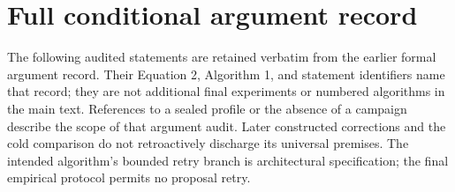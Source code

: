 \section{Full conditional argument record}
\label{sec:argument-record}

The following audited statements are retained verbatim from the earlier formal
argument record. Their Equation 2, Algorithm 1, and statement identifiers name
that record; they are not additional final experiments or numbered algorithms
in the main text. References to a sealed profile or the absence of a campaign
describe the scope of that argument audit. Later constructed corrections and
the cold comparison do not retroactively discharge its universal premises.
The intended algorithm's bounded retry branch is architectural specification;
the final empirical protocol permits no proposal retry.




